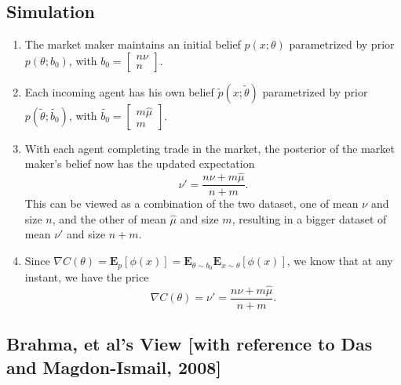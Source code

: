 \documentclass{article}
\begin{document}
        \subsection*{Simulation}
        \begin{enumerate}
            \item The market maker maintains an initial belief $p(x;\theta)$ parametrized by prior $p(\theta;b_0)$, with $b_0=\begin{bmatrix}
                n\nu\\n
            \end{bmatrix}$.
            \item Each incoming agent has his own belief $\tilde{p}(x;\tilde{\theta})$ parametrized by prior $p(\tilde{\theta};\tilde{b_0})$, with $\tilde{b_0}=\begin{bmatrix}
                m\hat{\mu}\\m
            \end{bmatrix}$.
            \item With each agent completing trade in the market, the posterior of the market maker's belief now has the updated expectation \[ \nu'=\frac{n\nu+m\hat{\mu}}{n+m}. \] This can be viewed as a combination of the two dataset, one of mean $\nu$ and size $n$, and the other of mean $\hat{\mu}$ and size $m$, resulting in a bigger dataset of mean $\nu'$ and size $n+m$.
            \item Since $\nabla C(\theta)=\mathbf{E}_{p}[\phi(x)]=\mathbf{E}_{\theta\sim b_0}\mathbf{E}_{x\sim\theta}[\phi(x)]$, we know that at any instant, we have the price $$\nabla C(\theta)=\nu'=\frac{n\nu+m\hat{\mu}}{n+m}.$$
        \end{enumerate}
        \subsection{Brahma, et al's View [with reference to Das and Magdon-Ismail, 2008]}
\end{document}
